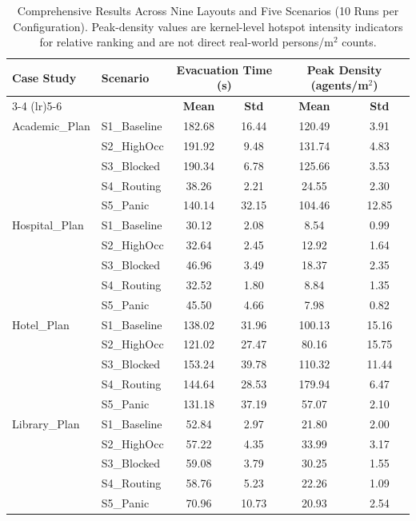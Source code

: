 \documentclass[journal]{IEEEtran}
\begin{document}
\begin{table}[t]
\centering
\caption{Comprehensive Results Across Nine Layouts and Five Scenarios (10 Runs per Configuration). Peak-density values are kernel-level hotspot intensity indicators for relative ranking and are not direct real-world persons/m$^2$ counts.}
\label{tab:results_main}
\begin{tabular}{llcccc}
\toprule
\textbf{Case Study} & \textbf{Scenario} & \multicolumn{2}{c}{\textbf{Evacuation Time (s)}} & \multicolumn{2}{c}{\textbf{Peak Density (agents/m$^2$)}} \\
\cmidrule(lr){3-4} \cmidrule(lr){5-6}
& & \textbf{Mean} & \textbf{Std} & \textbf{Mean} & \textbf{Std} \\
\midrule
Academic\_Plan & S1\_Baseline & 182.68 & 16.44 & 120.49 & 3.91 \\
 & S2\_HighOcc & 191.92 & 9.48 & 131.74 & 4.83 \\
 & S3\_Blocked & 190.34 & 6.78 & 125.66 & 3.53 \\
 & S4\_Routing & 38.26 & 2.21 & 24.55 & 2.30 \\
 & S5\_Panic & 140.14 & 32.15 & 104.46 & 12.85 \\
\midrule
Hospital\_Plan & S1\_Baseline & 30.12 & 2.08 & 8.54 & 0.99 \\
 & S2\_HighOcc & 32.64 & 2.45 & 12.92 & 1.64 \\
 & S3\_Blocked & 46.96 & 3.49 & 18.37 & 2.35 \\
 & S4\_Routing & 32.52 & 1.80 & 8.84 & 1.35 \\
 & S5\_Panic & 45.50 & 4.66 & 7.98 & 0.82 \\
\midrule
Hotel\_Plan & S1\_Baseline & 138.02 & 31.96 & 100.13 & 15.16 \\
 & S2\_HighOcc & 121.02 & 27.47 & 80.16 & 15.75 \\
 & S3\_Blocked & 153.24 & 39.78 & 110.32 & 11.44 \\
 & S4\_Routing & 144.64 & 28.53 & 179.94 & 6.47 \\
 & S5\_Panic & 131.18 & 37.19 & 57.07 & 2.10 \\
\midrule
Library\_Plan & S1\_Baseline & 52.84 & 2.97 & 21.80 & 2.00 \\
 & S2\_HighOcc & 57.22 & 4.35 & 33.99 & 3.17 \\
 & S3\_Blocked & 59.08 & 3.79 & 30.25 & 1.55 \\
 & S4\_Routing & 58.76 & 5.23 & 22.26 & 1.09 \\
 & S5\_Panic & 70.96 & 10.73 & 20.93 & 2.54 \\

\end{tabular}
\end{table}
\end{document}
